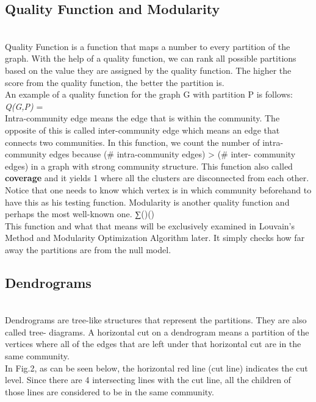 \documentclass[10pt]{article}
\begin{document}
\subsection{Quality Function and Modularity} \\

Quality Function is a function that maps a number to every partition of the graph. With the help of a quality function, we can rank all possible partitions based on the value they are assigned by the quality function. The higher the score from the quality function, the better the partition is. \\

An example of a quality function for the graph G with partition P is follows: \\

\textit{Q(G,P)} =  \\ 


Intra-community edge means the edge that is within the community. The opposite of this is called inter-community edge which means an edge that connects two communities. In this function, we count the number of intra-community edges because (# intra-community edges) > (# inter- community edges) in a graph with strong community structure. This function also called \textbf{coverage} and it yields 1 where all the clusters are disconnected from each other. Notice that one needs to know which vertex is in which community beforehand to have this as his testing function.
Modularity is another quality function and perhaps the most well-known one. ∑()() \\
This function and what that means will be exclusively examined in Louvain’s Method and Modularity Optimization Algorithm later. It simply checks how far away the partitions are from the null model. \\
\subsection{Dendrograms} \\

Dendrograms are tree-like structures that represent the partitions. They are also called tree- diagrams. A horizontal cut on a dendrogram means a partition of the vertices where all of the edges that are left under that horizontal cut are in the same community. \\

In Fig.2, as can be seen below, the horizontal red line (cut line) indicates the cut level. Since there are 4 intersecting lines with the cut line, all the children of those lines are considered to be in the same community. \\
\end{document}
